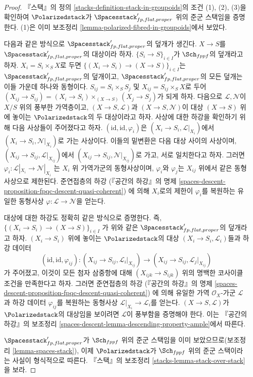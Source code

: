 \begin{proof}
『스택』의 정의 \ref{stacks-definition-stack-in-groupoids}의 조건 (1), (2),
(3)을 확인하여 $\Polarizedstack$가 $\Spacesstack'_{fp, flat, proper}$ 위의
준군 스택임을 증명한다. (1)은 이미 보조정리
\ref{lemma-polarized-fibred-in-groupoids}에서 보았다.

\medskip\noindent
다음과 같은 방식으로 $\Spacesstack'_{fp, flat, proper}$의 덮개가 생긴다.
$X \to S$를 $\Spacesstack'_{fp, flat, proper}$의 대상이라 하자.
$\{S_i \to S\}_{i \in I}$가 $\Sch_{fppf}$의 덮개라고 하자.
$X_i = S_i \times_S X$로 두면
$\{(X_i \to S_i) \to (X \to S)\}_{i \in I}$는
$\Spacesstack'_{fp, flat, proper}$의 덮개이고,
$\Spacesstack'_{fp, flat, proper}$의 모든 덮개는 이들 가운데
하나와 동형이다. $S_{ij} = S_i \times_S S_j$ 및
$X_{ij} = S_{ij} \times_S X$로 두어 $(X_{ij} \to S_{ij}) =
(X_i \to S_i) \times_{(X \to S)} (X_j \to S_j)$가 되게 하자.
다음으로 $\mathcal{L}, \mathcal{N}$이 $X/S$ 위의 풍부한 가역층이고,
$(X \to S, \mathcal{L})$과 $(X \to S, \mathcal{N})$이 대상
$(X \to S)$ 위에 놓이는 $\Polarizedstack$의 두 대상이라고 하자.
사상에 대한 하강을 확인하기 위해 다음 사상들이 주어졌다고 하자.
$(\text{id}, \text{id}, \varphi_i)$은
$(X_i \to S_i, \mathcal{L}|_{X_i})$에서
$(X_i \to S_i, \mathcal{N}|_{X_i})$로 가는 사상이다.
이들의 밑변환은 다음 대상 사이의 사상이며,
$(X_{ij} \to S_{ij}, \mathcal{L}|_{X_{ij}})$에서
$(X_{ij} \to S_{ij}, \mathcal{N}|_{X_{ij}})$로 가고,
서로 일치한다고 하자. 그러면
$\varphi_i : \mathcal{L}|_{X_i} \to \mathcal{N}|_{X_i}$
는 $X_i$ 위 가역가군의 동형사상이며, $\varphi_i$와 $\varphi_j$는
$X_{ij}$ 위에서 같은 동형사상으로 제한된다. 준연접층의 하강
(『공간의 하강』의 명제
\ref{spaces-descent-proposition-fpqc-descent-quasi-coherent})
에 의해 $X_i$로의 제한이 $\varphi_i$를 복원하는 유일한 동형사상
$\varphi : \mathcal{L} \to \mathcal{N}$을 얻는다.

\medskip\noindent
대상에 대한 하강도 정확히 같은 방식으로 증명한다. 즉,
$\{(X_i \to S_i) \to (X \to S)\}_{i \in I}$
가 위와 같은 $\Spacesstack'_{fp, flat, proper}$의 덮개라고 하자.
$(X_i \to S_i)$ 위에 놓이는 $\Polarizedstack$의 대상
$(X_i \to S_i, \mathcal{L}_i)$들과 하강 데이터
$$
(\text{id}, \text{id}, \varphi_{ij}) :
(X_{ij} \to S_{ij}, \mathcal{L}_i|_{X_{ij}})
\to
(X_{ij} \to S_{ij}, \mathcal{L}_j|_{X_{ij}})
$$
가 주어졌고, 이것이 모든 첨자 삼중항에 대해 $(X_{ijk} \to S_{ijk})$ 위의
명백한 코사이클 조건을 만족한다고 하자. 그러면 준연접층의 하강
(『공간의 하강』의 명제
\ref{spaces-descent-proposition-fpqc-descent-quasi-coherent})
에 의해 유일한 가역 $\mathcal{O}_X$-가군 $\mathcal{L}$과 하강 데이터
$\varphi_{ij}$를 복원하는 동형사상 $\mathcal{L}|_{X_i} \to \mathcal{L}_i$를
얻는다.
$(X \to S, \mathcal{L})$가 $\Polarizedstack$의 대상임을 보이려면
$\mathcal{L}$이 풍부함을 증명해야 한다.
이는 『공간의 하강』의 보조정리
\ref{spaces-descent-lemma-descending-property-ample}에서 따른다.

\medskip\noindent
$\Spacesstack'_{fp, flat, proper}$가 $\Sch_{fppf}$ 위의 준군 스택임을 이미
보았으므로(보조정리 \ref{lemma-spaces-stack}), 이제 $\Polarizedstack$가
$\Sch_{fppf}$ 위의 준군 스택이라는 사실이 형식적으로 따른다. 『스택』의
보조정리 \ref{stacks-lemma-stack-over-stack}을 보라.
\end{proof}

